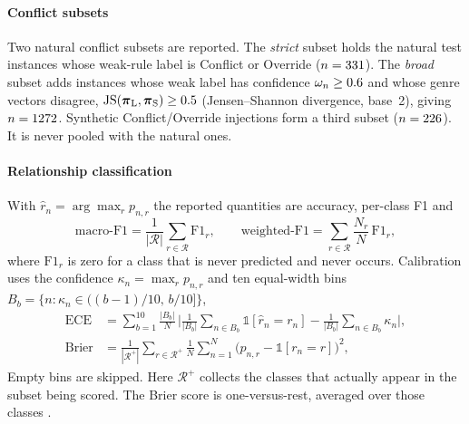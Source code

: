 \paragraph{Conflict subsets}
Two natural conflict subsets are reported. The \emph{strict} subset holds the natural test instances whose weak-rule label is Conflict or Override ($n=331$). The \emph{broad} subset adds instances whose weak label has confidence $\omega_n\ge0.6$ and whose genre vectors disagree, $\mathrm{JS}(\boldsymbol{\pi}_{\mathrm{L}},\boldsymbol{\pi}_{\mathrm{S}})\ge0.5$ (Jensen--Shannon divergence, base~2), giving $n=1272$. Synthetic Conflict/Override injections form a third subset ($n=226$). It is never pooled with the natural ones.

\paragraph{Relationship classification}
With $\hat{r}_n=\arg\max_r p_{n,r}$ the reported quantities are accuracy, per-class F1 and
\begin{equation}
  \label{eq:macrof1}
  \text{macro-F1}=\frac{1}{|\mathcal{R}|}\sum_{r\in\mathcal{R}}\mathrm{F1}_r,\qquad
  \text{weighted-F1}=\sum_{r\in\mathcal{R}}\frac{N_r}{N}\,\mathrm{F1}_r,
\end{equation}
where $\mathrm{F1}_r$ is zero for a class that is never predicted and never occurs. Calibration uses the confidence $\kappa_n=\max_r p_{n,r}$ and ten equal-width bins $B_b=\{n:\kappa_n\in((b-1)/10,\,b/10]\}$,
\begin{align}
  \mathrm{ECE} &= \sum_{b=1}^{10}\frac{|B_b|}{N}\,\Big|\frac{1}{|B_b|}\sum_{n\in B_b}\mathbb{1}[\hat{r}_n=r_n]-\frac{1}{|B_b|}\sum_{n\in B_b}\kappa_n\Big|, \label{eq:ece}\\
  \mathrm{Brier} &= \frac{1}{|\mathcal{R}^{+}|}\sum_{r\in\mathcal{R}^{+}}\frac{1}{N}\sum_{n=1}^{N}\big(p_{n,r}-\mathbb{1}[r_n=r]\big)^2, \label{eq:brier}
\end{align}
Empty bins are skipped. Here $\mathcal{R}^{+}$ collects the classes that actually appear in the subset being scored. The Brier score is one-versus-rest, averaged over those classes \cite{guo2017calibration}.


